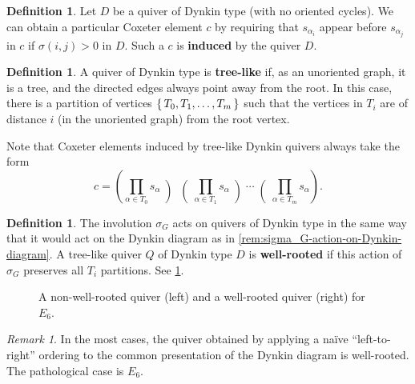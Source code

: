 \documentclass{amsart}
\theoremstyle{plain}
\theoremstyle{definition}
\newtheorem{definition}[theorem]{Definition}
\theoremstyle{remark}
\newtheorem{remark}[theorem]{Remark}
\newcommand{\defined}[1]{\textbf{#1}}
\begin{document}
  \begin{definition}
    \label{def:Coxeter-elt-induced-by-quiver}
    Let $D$ be a quiver of Dynkin type (with no oriented cycles). We can
    obtain a particular Coxeter element $c$ by requiring that
    $s_{\alpha_i}$ appear before $s_{\alpha_j}$ in $c$ if $\sigma(i, j)
    > 0$ in $D$. Such a $c$ is \defined{induced} by the quiver $D$.
  \end{definition}

  \begin{definition}
    \label{def:tree-like-quiver}
    A quiver of Dynkin type is \defined{tree-like} if, as an unoriented
    graph, it is a tree, and the directed edges always point away from
    the root. In this case, there is a partition of vertices $\set{T_0,
      T_1, \dotsc, T_m}$ such that the vertices in $T_i$ are of distance
    $i$ (in the unoriented graph) from the root vertex.

    Note that Coxeter elements induced by tree-like Dynkin quivers
    always take the form \[ c = \left( \prod_{\alpha \in T_0} s_{\alpha}
      \middle) \middle( \prod_{\alpha \in T_1} s_{\alpha} \middle)
      \dotsb \middle( \prod_{\alpha \in T_m} s_{\alpha} \right). \]
  \end{definition}

  \begin{definition}
    \label{def:well-rooted-tree-like-quiver}
    The involution $\sigma_G$ acts on quivers of Dynkin type in the same
    way that it would act on the Dynkin diagram as in
    \cref{rem:sigma_G-action-on-Dynkin-diagram}. A tree-like quiver $Q$
    of Dynkin type $D$ is \defined{well-rooted} if this action of
    $\sigma_G$ preserves all $T_i$ partitions. See
    \cref{fig:well-rooted-quivers}.
  \end{definition}

  \begin{figure}[h]
    \centering 

    \caption{A non-well-rooted quiver (left) and a well-rooted quiver
      (right) for $E_6$.
      \label{fig:well-rooted-quivers}
    }
  \end{figure}

  \begin{remark}
    In the most cases, the quiver obtained by applying a na\"ive
    ``left-to-right'' ordering to the common presentation of the Dynkin
    diagram is well-rooted. The pathological case is $E_6$.
  \end{remark}
\end{document}
